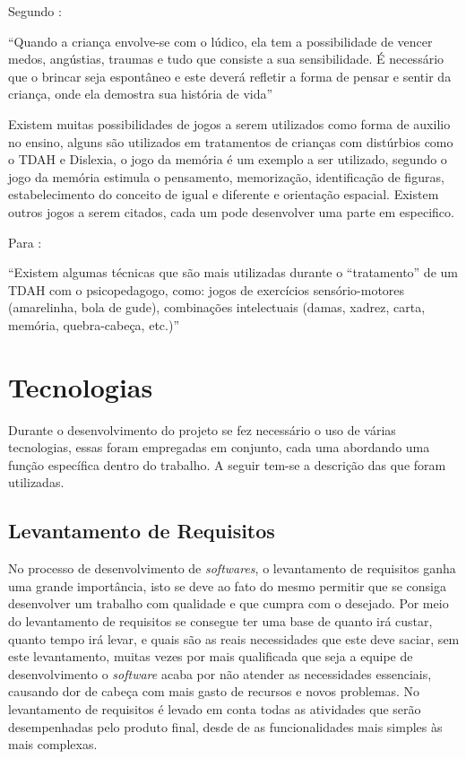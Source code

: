 \documentclass[
	12pt,				%
    oneside,			%
	a4paper,			%
	english,			%
	french,				%
	spanish,			%
	brazil,				%
	]{abntex2}
\begin{document}
	Segundo :
	\begin{citacao}
		“Quando a criança envolve-se com o lúdico, ela tem a possibilidade de vencer medos, angústias, traumas e tudo que consiste a sua sensibilidade. É necessário que o brincar seja espontâneo e este deverá refletir a forma de pensar e sentir da criança, onde ela demostra sua história de vida”
	\end{citacao}
	
	Existem muitas possibilidades de jogos a serem utilizados como forma de auxilio no ensino, alguns são utilizados em tratamentos de crianças com distúrbios como o TDAH e Dislexia, o jogo da memória é um exemplo a ser utilizado, segundo  o jogo da memória estimula o pensamento, memorização, identificação de figuras, estabelecimento do conceito de igual e diferente e orientação espacial. Existem outros jogos a serem citados, cada um pode desenvolver uma parte em especifico.
	
	Para :
	\begin{citacao}		
		“Existem algumas técnicas que são mais utilizadas durante o “tratamento” de um TDAH com o psicopedagogo, como: jogos de exercícios sensório-motores (amarelinha, bola de gude), combinações intelectuais (damas, xadrez, carta, memória, quebra-cabeça, etc.)”
	\end{citacao}
\section{Tecnologias}

	Durante o desenvolvimento do projeto se fez necessário o uso de várias tecnologias, essas foram empregadas em conjunto, cada uma abordando uma função específica dentro do trabalho. A seguir tem-se a descrição das que foram utilizadas.

	\subsection{Levantamento de Requisitos}
		
	No processo de desenvolvimento de \textit{softwares}, o levantamento de requisitos ganha uma grande importância, isto se deve ao fato do mesmo permitir que se consiga desenvolver um trabalho com qualidade e que cumpra com o desejado. Por meio do levantamento de requisitos se consegue ter uma base de quanto irá custar, quanto tempo irá levar, e quais são as reais necessidades que este deve saciar, sem este levantamento, muitas vezes por mais qualificada que seja a equipe de desenvolvimento o \textit{software} acaba por não atender as necessidades essenciais, causando dor de cabeça com mais gasto de recursos e novos problemas. No levantamento de requisitos é levado em conta todas as atividades que serão desempenhadas pelo produto final, desde de as funcionalidades mais simples às mais complexas.
	
\end{document}
